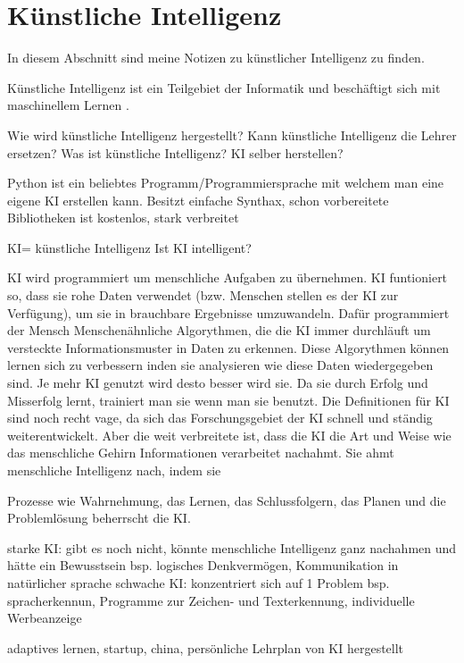 \section{Künstliche Intelligenz}
\label{sec:ai}

In diesem Abschnitt sind meine Notizen zu künstlicher Intelligenz zu finden.

Künstliche Intelligenz ist ein Teilgebiet der Informatik und beschäftigt sich mit maschinellem Lernen \citep{ai-wikipedia}.




Wie wird künstliche Intelligenz hergestellt?
Kann künstliche Intelligenz die Lehrer ersetzen?
Was ist künstliche Intelligenz?
KI selber herstellen?


Python ist ein beliebtes Programm/Programmiersprache mit welchem man eine eigene KI erstellen kann.
Besitzt einfache Synthax, schon vorbereitete Bibliotheken
ist kostenlos, stark verbreitet

KI= künstliche Intelligenz 
Ist KI intelligent?

KI wird programmiert um menschliche Aufgaben zu übernehmen.
KI funtioniert so, dass sie rohe Daten verwendet (bzw. Menschen stellen es der KI zur Verfügung), um sie in brauchbare Ergebnisse umzuwandeln.
Dafür programmiert der Mensch Menschenähnliche Algorythmen, die die KI immer durchläuft um versteckte Informationsmuster in Daten zu erkennen.
Diese Algorythmen können lernen sich zu verbessern inden sie analysieren wie diese Daten wiedergegeben sind.
Je mehr KI genutzt wird desto besser wird sie. Da sie durch Erfolg und Misserfolg lernt, trainiert man sie wenn man sie benutzt.
Die Definitionen für KI sind noch recht vage, da sich das Forschungsgebiet der KI schnell und ständig weiterentwickelt. Aber die weit verbreitete ist,
dass die KI die Art und Weise wie das menschliche Gehirn Informationen verarbeitet nachahmt.
Sie ahmt menschliche Intelligenz nach, indem sie 

Prozesse wie Wahrnehmung, das Lernen, das Schlussfolgern, das Planen und die Problemlösung beherrscht die KI.

starke KI: gibt es noch nicht, könnte menschliche Intelligenz ganz nachahmen und hätte ein Bewusstsein bsp. logisches Denkvermögen, 
Kommunikation in natürlicher sprache
schwache KI: konzentriert sich auf 1 Problem bsp. spracherkennun, Programme zur Zeichen- und Texterkennung,
individuelle Werbeanzeige

adaptives lernen, startup, china, persönliche Lehrplan von KI hergestellt
